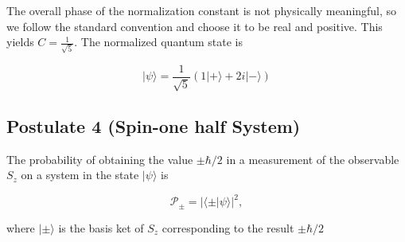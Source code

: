 \documentclass[twocolumn]{article}
\begin{document}
The overall phase of the normalization constant is not physically meaningful, so we follow the standard convention and choose it to be real and positive. This yields $C=\frac{1}{\sqrt{5}}$. The normalized quantum state is 

\begin{equation}
    |\psi\rangle=\frac{1}{\sqrt{5}}(1|+\rangle+2i|-\rangle)
\end{equation}

\subsection{Postulate 4 (Spin-one half System)}

The probability of obtaining the value $\pm\hbar/2$ in a measurement of the observable $S_z$ on a system in the state $|\psi\rangle$ is

\begin{equation}
    \mathcal{P}_\pm=|\langle\pm|\psi\rangle|^2,
\end{equation}

where $|\pm\rangle$ is the basis ket of $S_z$ corresponding to the result $\pm\hbar/2$
\end{document}
